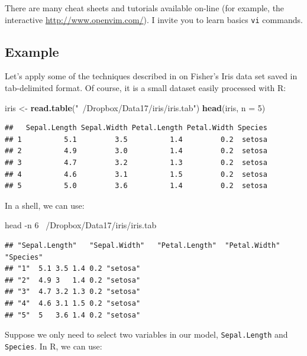 \documentclass[]{book}
\newenvironment{Shaded}{\begin{snugshade}}{\end{snugshade}}
\newcommand{\KeywordTok}[1]{\textcolor[rgb]{0.13,0.29,0.53}{\textbf{#1}}}
\newcommand{\DataTypeTok}[1]{\textcolor[rgb]{0.13,0.29,0.53}{#1}}
\newcommand{\DecValTok}[1]{\textcolor[rgb]{0.00,0.00,0.81}{#1}}
\newcommand{\StringTok}[1]{\textcolor[rgb]{0.31,0.60,0.02}{#1}}
\newcommand{\FunctionTok}[1]{\textcolor[rgb]{0.00,0.00,0.00}{#1}}
\newcommand{\NormalTok}[1]{#1}
\theoremstyle{definition}
\theoremstyle{definition}
\theoremstyle{definition}
\theoremstyle{remark}
\begin{document}
There are many cheat sheets and tutorials available on-line (for
example, the interactive \url{http://www.openvim.com/}). I invite you to
learn basics \texttt{vi} commands.

\subsection{Example}\label{example}

Let's apply some of the techniques described in \citet{Blackwell2012} on
Fisher's Iris data set saved in tab-delimited format. Of course, it is a
small dataset easily processed with R:

\begin{Shaded}
\begin{Highlighting}[]
\NormalTok{iris <-}\StringTok{ }\KeywordTok{read.table}\NormalTok{(}\StringTok{"~/Dropbox/Data17/iris/iris.tab"}\NormalTok{)}
\KeywordTok{head}\NormalTok{(iris, }\DataTypeTok{n =} \DecValTok{5}\NormalTok{)}
\end{Highlighting}
\end{Shaded}

\begin{verbatim}
##   Sepal.Length Sepal.Width Petal.Length Petal.Width Species
## 1          5.1         3.5          1.4         0.2  setosa
## 2          4.9         3.0          1.4         0.2  setosa
## 3          4.7         3.2          1.3         0.2  setosa
## 4          4.6         3.1          1.5         0.2  setosa
## 5          5.0         3.6          1.4         0.2  setosa
\end{verbatim}

In a shell, we can use:

\begin{Shaded}
\begin{Highlighting}[]
\FunctionTok{head}\NormalTok{ -n 6 ~/Dropbox/Data17/iris/iris.tab}
\end{Highlighting}
\end{Shaded}

\begin{verbatim}
## "Sepal.Length"   "Sepal.Width"   "Petal.Length"  "Petal.Width"   "Species"
## "1"  5.1 3.5 1.4 0.2 "setosa"
## "2"  4.9 3   1.4 0.2 "setosa"
## "3"  4.7 3.2 1.3 0.2 "setosa"
## "4"  4.6 3.1 1.5 0.2 "setosa"
## "5"  5   3.6 1.4 0.2 "setosa"
\end{verbatim}

Suppose we only need to select two variables in our model,
\texttt{Sepal.Length} and \texttt{Species}. In R, we can use:
\end{document}
